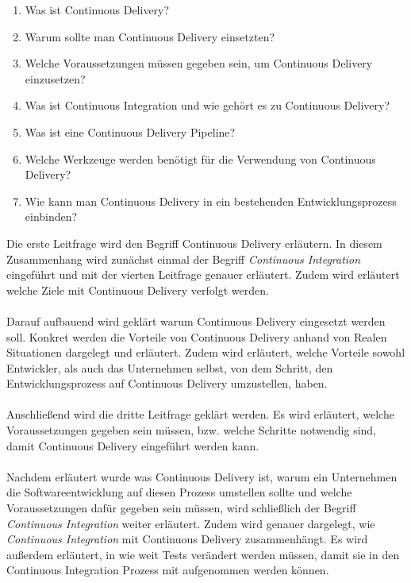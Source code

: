 \begin{enumerate}
	\item Was ist Continuous Delivery?
	\item Warum sollte man Continuous Delivery einsetzten?
	\item Welche Voraussetzungen müssen gegeben sein, um Continuous Delivery einzusetzen?
	\item Was ist Continuous Integration und wie gehört es zu Continuous Delivery?
    \item Was ist eine Continuous Delivery Pipeline?
    \item Welche Werkzeuge werden benötigt für die Verwendung von Continuous Delivery?
	\item Wie kann man Continuous Delivery in ein bestehenden Entwicklungsprozess einbinden?
\end{enumerate}
Die erste Leitfrage wird den Begriff Continuous Delivery erläutern. In diesem Zusammenhang wird zunächst einmal der Begriff \textit{Continuous Integration} eingeführt und mit der vierten Leitfrage genauer erläutert. Zudem wird erläutert welche Ziele mit Continuous Delivery verfolgt werden.\\\\
Darauf aufbauend wird geklärt warum Continuous Delivery eingesetzt werden soll. Konkret werden die Vorteile von Continuous Delivery anhand von Realen Situationen dargelegt und erläutert. Zudem wird erläutert, welche Vorteile sowohl Entwickler, als auch das Unternehmen selbst, von dem Schritt, den Entwicklungsprozess auf Continuous Delivery umzustellen, haben.\\\\
Anschließend wird die dritte Leitfrage geklärt werden. Es wird erläutert, welche Voraussetzungen gegeben sein müssen, bzw. welche Schritte notwendig sind, damit Continuous Delivery eingeführt werden kann.\\\\
Nachdem erläutert wurde was Continuous Delivery ist, warum ein Unternehmen die Softwareentwicklung auf diesen Prozess umstellen sollte und welche Voraussetzungen dafür gegeben sein müssen, wird schließlich der Begriff \textit{Continuous Integration} weiter erläutert. Zudem wird genauer dargelegt, wie \textit{Continuous Integration} mit Continuous Delivery zusammenhängt. Es wird außerdem erläutert, in wie weit Tests verändert werden müssen, damit sie in den Continuous Integration Prozess mit aufgenommen werden können.\\\\

